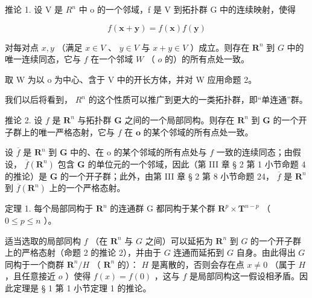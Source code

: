 推论 1. 设 V 是 \(R^{n}\) 中 o 的一个邻域，f 是 V 到拓扑群 G 中的连续映射，使得

\[
f (\boldsymbol {x} + \boldsymbol {y}) = f (\boldsymbol {x}) f (\boldsymbol {y})
\]

对每对点 \(x, y\) （满足 \(x \in V\) 、 \(y \in V\) 与 \(x + y \in V\) ）成立。则存在 \(\mathbf{R}^n\) 到 \(G\) 中的唯一连续同态，它与 \(f\) 在一个邻域 \(W\) （ \(o\) 的）的所有点处一致。

取 W 为以 o 为中心、含于 V 中的开长方体，并对 W 应用命题 2。

我们以后将看到， \(R^{n}\) 的这个性质可以推广到更大的一类拓扑群，即“单连通”群。

推论 2. 设 \(f\) 是 \(\mathbf{R}^n\) 与拓扑群 \(\mathbf{G}\) 之间的一个局部同构。则存在 \(\mathbf{R}^n\) 到 \(\mathbf{G}\) 的一个开子群上的唯一严格态射，它与 \(f\) 在 \(\mathbf{o}\) 的某个邻域的所有点处一致。

设 \(\overline{f}\) 是 \(\mathbf{R}^n\) 到 \(\mathbf{G}\) 中的、在 o 的某个邻域的所有点处与 \(f\) 一致的连续同态；由假设， \(\overline{f}(\mathbf{R}^n)\) 包含 \(\mathbf{G}\) 的单位元的一个邻域，因此（第 III 章 § 2 第 1 小节命题 4 的推论）是 \(\mathbf{G}\) 的一个开子群；此外，由第 III 章 § 2 第 8 小节命题 24， \(\overline{f}\) 是 \(\mathbf{R}^n\) 到 \(\overline{f}(\mathbf{R}^n)\) 上的一个严格态射。

定理 1. 每个局部同构于 \(\mathbf{R}^n\) 的连通群 G 都同构于某个群 \(\mathbf{R}^p \times \mathbf{T}^{n-p}\) （ \(0 \leqslant p \leqslant n\) ）。

适当选取的局部同构 \(f\) （在 \(\mathbf{R}^n\) 与 \(G\) 之间）可以延拓为 \(\mathbf{R}^n\) 到 \(G\) 的一个开子群上的严格态射（命题 2 的推论 2），并由于 \(G\) 连通而延拓到 \(G\) 自身。由此得出 \(G\) 同构于一个商群 \(\mathbf{R}^n / H\) （ \(\mathbf{R}^n\) 的）： \(H\) 是离散的，否则会存在点 \(x \neq 0\) （属于 \(H\) ，且任意接近 \(o\) ）使得 \(f(x) = f(0)\) ，这与 \(f\) 是局部同构这一假设相矛盾。因此定理是 § 1 第 1 小节定理 1 的推论。

